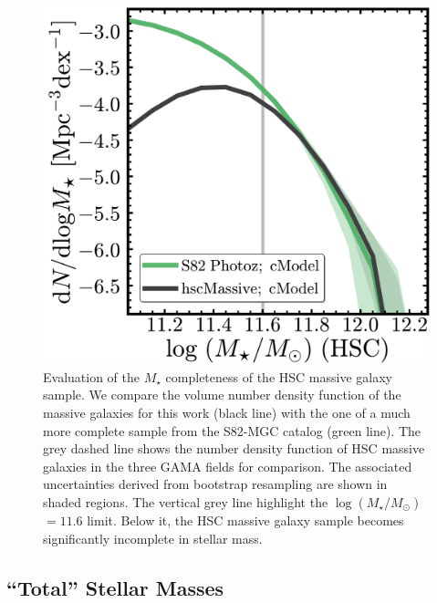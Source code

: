 \documentclass[a4paper,fleqn,usenatbib]{mnras}
\def\mstar{{$M_{\star}$}}
\def\logms{{$\log (M_{\star}/M_{\odot})$}}
\begin{document}

  \begin{figure}
      \centering 
      \includegraphics[width=\columnwidth]{fig/redbcg_completeness}
      \caption{
          Evaluation of the \mstar{} completeness of the HSC massive galaxy sample.
          We compare the volume number density function of the massive galaxies 
          for this work (black line) with the one of a much more complete sample
          from the S82-MGC catalog (green line). 
          The grey dashed line shows the number density function of HSC massive 
          galaxies in the three GAMA fields for comparison.
          The associated uncertainties derived from bootstrap resampling are shown in 
          shaded regions. 
          The vertical grey line highlight the \logms{}$=11.6$ limit.  
          Below it, the HSC massive galaxy sample becomes significantly incomplete in 
          stellar mass. 
          }
      \label{fig:mass_complete}
  \end{figure}     

\subsection{``Total'' Stellar Masses}
    \label{ssec:mtotal}
    
\end{document}
